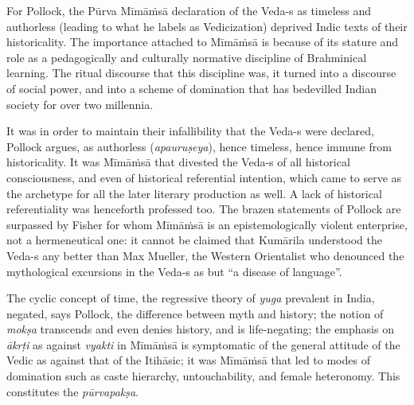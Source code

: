 For Pollock, the Pūrva Mīmāṁsā declaration of the Veda-s as timeless and authorless (leading to what he labels as Vedicization) deprived Indic texts of their historicality. The importance attached to Mīmāṁsā is because of its stature and role as a pedagogically and culturally normative discipline of Brahminical learning. The ritual discourse that this discipline was, it turned into a discourse of social power, and into a scheme of domination that has bedevilled Indian society for over two millennia.

It was in order to maintain their infallibility that the Veda-s were declared, Pollock argues, as authorless (\textit{apauruṣeya}), hence timeless, hence immune from historicality. It was Mīmāṁsā that divested the Veda-s of all historical consciousness, and even of historical referential intention, which came to serve as the archetype for all the later literary production as well. A lack of historical referentiality was henceforth professed too. The brazen statements of Pollock are surpassed by Fisher for whom Mīmāṁsā is an epistemologically violent enterprise, not a hermeneutical one: it cannot be claimed that Kumārila understood the Veda-s any better than Max Mueller, the Western Orientalist who denounced the mythological excursions in the Veda-s as but “a disease of language”. 

The cyclic concept of time, the regressive theory of \textit{yuga} prevalent in India, negated, says Pollock, the difference between myth and history; the notion of \textit{mokṣa} transcends and even denies history, and is life-negating; the emphasis on \textit{ākrṭi} as against \textit{vyakti} in Mīmāṁsā is symptomatic of the general attitude of the Vedic as against that of the Itihāsic; it was Mīmāṁsā that led to modes of domination such as caste hierarchy, untouchability, and female heteronomy. This constitutes the \textit{pūrvapakṣa}.

